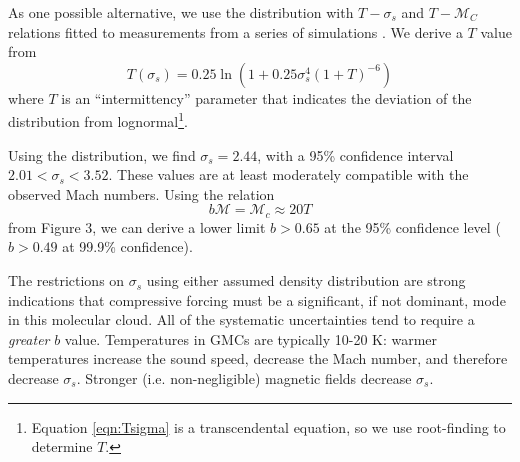 
As one possible alternative, we use the
\citet{Hopkins2013a} distribution with $T-\sigma_s$ and $T-\mathcal{M}_C$
relations fitted to measurements from a series of simulations
\citep{Kowal2007a,Kritsuk2007a,Schmidt2009a,Federrath2010a,Federrath2012a,Konstandin2012a,Molina2012a}.
We derive a $T$ value from 
\begin{equation} 
    \label{eqn:Tsigma}
    T(\sigma_s) = 0.25 \ln (1+0.25 \sigma_s^4 (1+T)^{-6})
\end{equation}
where $T$ is an ``intermittency'' parameter that indicates the
deviation of the distribution from lognormal\footnote{Equation \ref{eqn:Tsigma}
is a transcendental equation, so we use root-finding to determine $T$.}.  

Using the \citet{Hopkins2013a} distribution, we find $\sigma_s=2.44$, with
a 95\% confidence interval $2.01 < \sigma_s < 3.52$.  These values are at least
moderately compatible with the observed Mach numbers.  Using the relation 
\begin{equation}
    \label{eqn:McMT}
    b \mathcal{M} = \mathcal{M}_c  \approx 20 T
\end{equation}
from \citet{Hopkins2013a} Figure 3, we can derive a lower limit $b>0.65$ at the
95\% confidence level ($b>0.49$ at 99.9\% confidence).


% 
% 
% 


The restrictions on $\sigma_s$ using either assumed density distribution are
strong indications that compressive forcing must be a significant, if not
dominant, mode in this molecular cloud.  
All of the systematic uncertainties tend to require a \emph{greater} $b$
value.  Temperatures in GMCs are typically 10-20 K: warmer temperatures
increase the sound speed, decrease the Mach number, and therefore decrease
$\sigma_s$.  Stronger (i.e. non-negligible) magnetic fields decrease
$\sigma_s$.


